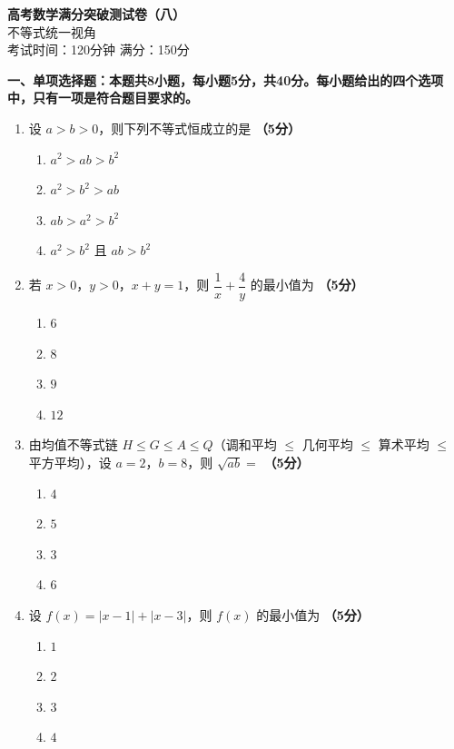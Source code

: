 \documentclass[12pt, a4paper]{ctexart}
\newcommand{\score}[1]{\hfill\textbf{（#1分）}}
\begin{document}
\begin{center}
{\LARGE\bfseries 高考数学满分突破测试卷（八）}\\[8pt]
{\large 不等式统一视角}\\[6pt]
考试时间：120分钟 \quad 满分：150分
\end{center}

\vspace{10pt}

{\large\bfseries 一、单项选择题：本题共8小题，每小题5分，共40分。每小题给出的四个选项中，只有一项是符合题目要求的。}

\vspace{8pt}

\begin{enumerate}

\item 设 $a>b>0$，则下列不等式恒成立的是 \score{5}
\begin{enumerate}[label=\Alph*.]
    \item $a^2>ab>b^2$
    \item $a^2>b^2>ab$
    \item $ab>a^2>b^2$
    \item $a^2>b^2$ 且 $ab>b^2$
\end{enumerate}

\item 若 $x>0$，$y>0$，$x+y=1$，则 $\dfrac{1}{x}+\dfrac{4}{y}$ 的最小值为 \score{5}
\begin{enumerate}[label=\Alph*.]
    \item $6$
    \item $8$
    \item $9$
    \item $12$
\end{enumerate}

\item 由均值不等式链 $H\leq G\leq A\leq Q$（调和平均 $\leq$ 几何平均 $\leq$ 算术平均 $\leq$ 平方平均），设 $a=2$，$b=8$，则 $\sqrt{ab}=$ \score{5}
\begin{enumerate}[label=\Alph*.]
    \item $4$
    \item $5$
    \item $3$
    \item $6$
\end{enumerate}

\item 设 $f(x)=|x-1|+|x-3|$，则 $f(x)$ 的最小值为 \score{5}
\begin{enumerate}[label=\Alph*.]
    \item $1$
    \item $2$
    \item $3$
    \item $4$
\end{enumerate}


\end{enumerate}
\end{document}
